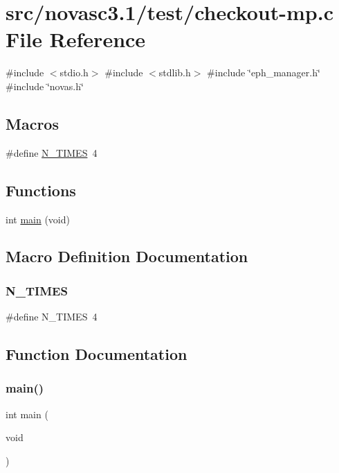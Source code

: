 \hypertarget{checkout-mp_8c}{}\section{src/novasc3.1/test/checkout-\/mp.c File Reference}
\label{checkout-mp_8c}
{\ttfamily \#include $<$stdio.\+h$>$}\newline
{\ttfamily \#include $<$stdlib.\+h$>$}\newline
{\ttfamily \#include \char`\"{}eph\+\_\+manager.\+h\char`\"{}}\newline
{\ttfamily \#include \char`\"{}novas.\+h\char`\"{}}\newline
\subsection*{Macros}
\begin{DoxyCompactItemize}
\item 
\#define \mbox{\hyperlink{checkout-mp_8c_af0c96fa4c13709446e360bb80e2ddc45}{N\+\_\+\+T\+I\+M\+ES}}~4
\end{DoxyCompactItemize}
\subsection*{Functions}
\begin{DoxyCompactItemize}
\item 
int \mbox{\hyperlink{checkout-mp_8c_a840291bc02cba5474a4cb46a9b9566fe}{main}} (void)
\end{DoxyCompactItemize}


\subsection{Macro Definition Documentation}
\mbox{\label{checkout-mp_8c_af0c96fa4c13709446e360bb80e2ddc45}} 
\subsubsection{\texorpdfstring{N\+\_\+\+T\+I\+M\+ES}{N\_TIMES}}
{\footnotesize\ttfamily \#define N\+\_\+\+T\+I\+M\+ES~4}



\subsection{Function Documentation}
\mbox{\label{checkout-mp_8c_a840291bc02cba5474a4cb46a9b9566fe}} 
\subsubsection{\texorpdfstring{main()}{main()}}
{\footnotesize\ttfamily int main (\begin{DoxyParamCaption}\item[{void}]{ }\end{DoxyParamCaption})}

